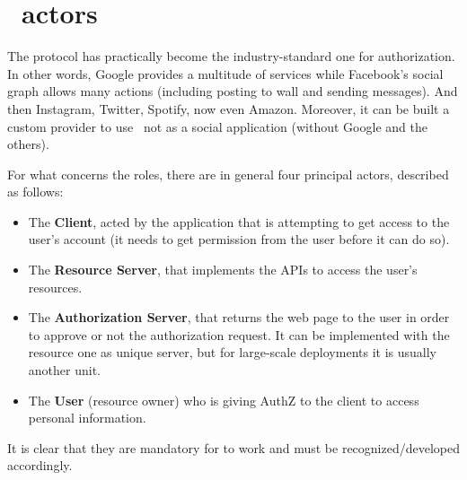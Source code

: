 \section{\oauth\ actors}
The protocol has practically become the industry-standard one for authorization. In other words, Google provides a multitude of services while Facebook's social graph allows many actions (including posting to wall and sending messages). And then Instagram, Twitter, Spotify, now even Amazon. Moreover, it can be built a custom provider to use \oauth\ not as a social application (without Google and the others).

For what concerns the roles, there are in general four principal actors, described as follows:


\begin{itemize}
    \item The \textbf{Client}, acted by the application that is attempting to get access to the user's account (it needs to get permission from the user before it can do so).
    \item The \textbf{Resource Server}, that implements the APIs to access the user's resources.
    \item The \textbf{Authorization Server}, that returns the web page to the user in order to approve or not the authorization request. It can be implemented with the resource one as unique server, but for large-scale deployments it is usually another unit.
    \item The \textbf{User} (resource owner) who is giving AuthZ to the client to access personal information.
\end{itemize}

It is clear that they are mandatory for \textit{\oauth} to work and must be recognized/developed accordingly. 

